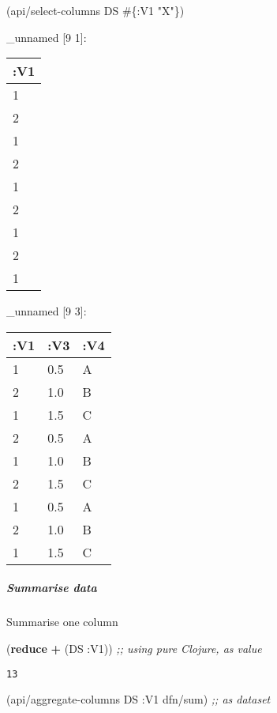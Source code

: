 \documentclass[]{article}
\newenvironment{Shaded}{\begin{snugshade}}{\end{snugshade}}
\newcommand{\AttributeTok}[1]{\textcolor[rgb]{0.77,0.63,0.00}{#1}}
\newcommand{\CommentTok}[1]{\textcolor[rgb]{0.56,0.35,0.01}{\textit{#1}}}
\newcommand{\KeywordTok}[1]{\textcolor[rgb]{0.13,0.29,0.53}{\textbf{#1}}}
\newcommand{\NormalTok}[1]{#1}
\newcommand{\StringTok}[1]{\textcolor[rgb]{0.31,0.60,0.02}{#1}}
\newcommand{\VariableTok}[1]{\textcolor[rgb]{0.00,0.00,0.00}{#1}}
\let\oldsubparagraph\subparagraph
\renewcommand{\subparagraph}[1]{\oldsubparagraph{#1}\mbox{}}
\begin{document}
\begin{Shaded}
\begin{Highlighting}[]
\NormalTok{(api/select-columns DS #\{}\AttributeTok{:V1} \StringTok{"X"}\NormalTok{\})}
\end{Highlighting}
\end{Shaded}

\_unnamed {[}9 1{]}:

\begin{longtable}[]{@{}l@{}}
\toprule
:V1\tabularnewline
\midrule
\endhead
1\tabularnewline
2\tabularnewline
1\tabularnewline
2\tabularnewline
1\tabularnewline
2\tabularnewline
1\tabularnewline
2\tabularnewline
1\tabularnewline
\bottomrule
\end{longtable}

\begin{Shaded}
\end{Shaded}

\_unnamed {[}9 3{]}:

\begin{longtable}[]{@{}lll@{}}
\toprule
:V1 & :V3 & :V4\tabularnewline
\midrule
\endhead
1 & 0.5 & A\tabularnewline
2 & 1.0 & B\tabularnewline
1 & 1.5 & C\tabularnewline
2 & 0.5 & A\tabularnewline
1 & 1.0 & B\tabularnewline
2 & 1.5 & C\tabularnewline
1 & 0.5 & A\tabularnewline
2 & 1.0 & B\tabularnewline
1 & 1.5 & C\tabularnewline
\bottomrule
\end{longtable}

\hypertarget{summarise-data}{%
\subparagraph{Summarise data}\label{summarise-data}}

Summarise one column

\begin{Shaded}
\begin{Highlighting}[]
\NormalTok{(}\KeywordTok{reduce} \KeywordTok{+}\NormalTok{ (DS }\AttributeTok{:V1}\NormalTok{)) }\CommentTok{;; using pure Clojure, as value}
\end{Highlighting}
\end{Shaded}

\begin{verbatim}
13
\end{verbatim}

\begin{Shaded}
\begin{Highlighting}[]
\NormalTok{(api/aggregate-columns DS }\AttributeTok{:V1}\NormalTok{ dfn/sum) }\CommentTok{;; as dataset}
\end{Highlighting}
\end{Shaded}
\end{document}
